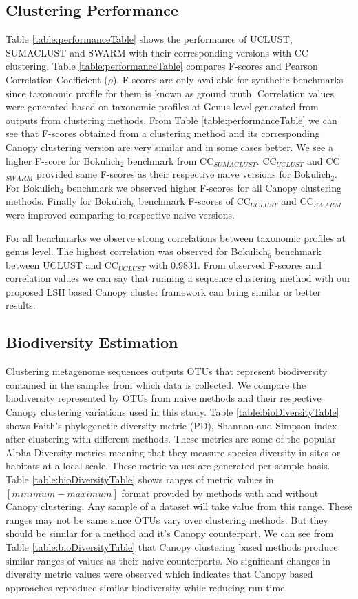 \documentclass[10pt, conference, compsocconf]{IEEEtran}
\begin{document}
\subsection{\textbf{Clustering Performance}}
Table \ref{table:performanceTable} shows the performance of  UCLUST, SUMACLUST and SWARM with their corresponding versions with CC clustering. Table \ref{table:performanceTable} compares F-scores and Pearson Correlation Coefficient ($\rho$). F-scores are only available for synthetic benchmarks since taxonomic profile for them is known as ground truth. Correlation values were generated based on taxonomic profiles at Genus level generated from outputs from clustering methods. From Table \ref{table:performanceTable} we can see that F-scores obtained from a clustering method and its corresponding Canopy clustering version are very similar and in some cases better. We see a higher F-score for Bokulich$_2$ benchmark from CC$_{SUMACLUST}$. CC$_{UCLUST}$ and CC$_{SWARM}$ provided same F-scores as their respective naive versions for Bokulich$_2$. For Bokulich$_3$ benchmark we observed higher F-scores for all Canopy clustering methods. Finally for Bokulich$_6$ benchmark F-scores of CC$_{UCLUST}$ and CC$_{SWARM}$ were improved comparing to respective naive versions.

For all benchmarks we observe strong correlations between taxonomic profiles at genus level. The highest correlation was observed for Bokulich$_6$ benchmark between UCLUST and CC$_{UCLUST}$ with 0.9831. From observed F-scores and correlation values we can say that running a sequence clustering method with our proposed LSH based Canopy cluster framework can bring similar or better results.


\subsection{\textbf{Biodiversity Estimation}} Clustering metagenome sequences outputs OTUs that represent biodiversity contained in the samples from which data is collected. We compare the biodiversity represented by OTUs from naive methods and their respective Canopy clustering variations used in this study. Table \ref{table:bioDiversityTable} shows Faith’s phylogenetic diversity metric (PD), Shannon and Simpson index after clustering with different methods. These metrics are some of the popular Alpha Diversity metrics meaning that they measure species diversity in sites or habitats at a local scale. These metric values are generated per sample basis. Table \ref{table:bioDiversityTable} shows ranges of metric values in $[minimum-maximum]$ format provided by methods with and without Canopy clustering. Any sample of a dataset will take value from this range. These ranges may not be same since OTUs vary over clustering methods. But they should be similar for a method and it's Canopy counterpart. We can see from Table \ref{table:bioDiversityTable} that Canopy clustering based methods produce similar ranges of values as their naive counterparts. No significant changes in diversity metric values were observed which indicates that Canopy based approaches reproduce similar biodiversity while reducing run time.
\end{document}
